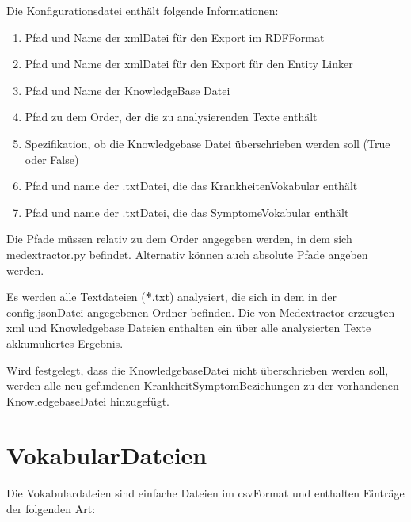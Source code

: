 \documentclass[letterpaper,10pt,english]{sphinxmanual}
\begin{document}
\sphinxAtStartPar
Die Konfigurationsdatei enthält folgende Informationen:
\begin{enumerate}
%
\item {} 
\sphinxAtStartPar
Pfad und Name der xml\sphinxhyphen{}Datei für den Export im RDF\sphinxhyphen{}Format

\item {} 
\sphinxAtStartPar
Pfad und Name der xml\sphinxhyphen{}Datei für den Export für den Entity Linker

\item {} 
\sphinxAtStartPar
Pfad und Name der KnowledgeBase Datei

\item {} 
\sphinxAtStartPar
Pfad zu dem Order, der die zu analysierenden Texte enthält

\item {} 
\sphinxAtStartPar
Spezifikation, ob die Knowledgebase Datei überschrieben werden soll
(True oder False)

\item {} 
\sphinxAtStartPar
Pfad und name der .txt\sphinxhyphen{}Datei, die das Krankheiten\sphinxhyphen{}Vokabular enthält

\item {} 
\sphinxAtStartPar
Pfad und name der .txt\sphinxhyphen{}Datei, die das Symptome\sphinxhyphen{}Vokabular enthält

\end{enumerate}

\sphinxAtStartPar
Die Pfade müssen relativ zu dem Order angegeben werden, in dem sich
medextractor.py befindet. Alternativ können auch absolute Pfade angeben
werden.

\sphinxAtStartPar
Es werden alle Textdateien ({\color{red}\bfseries{}*}.txt) analysiert, die sich in dem in der
config.json\sphinxhyphen{}Datei angegebenen Ordner befinden. Die von Medextractor
erzeugten xml\sphinxhyphen{} und Knowledgebase\sphinxhyphen{} Dateien enthalten ein über alle
analysierten Texte akkumuliertes Ergebnis.

\sphinxAtStartPar
Wird festgelegt, dass die Knowledgebase\sphinxhyphen{}Datei nicht überschrieben werden
soll, werden alle neu gefundenen Krankheit\sphinxhyphen{}Symptom\sphinxhyphen{}Beziehungen zu der
vorhandenen Knowledgebase\sphinxhyphen{}Datei hinzugefügt.


\chapter{Vokabular\sphinxhyphen{}Dateien}
\label{\detokenize{readme:vokabular-dateien}}
\sphinxAtStartPar
Die Vokabulardateien sind einfache Dateien im csv\sphinxhyphen{}Format und enthalten
Einträge der folgenden Art:
\end{document}
